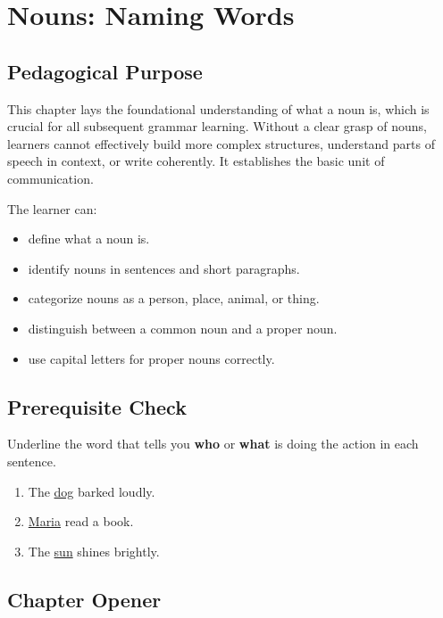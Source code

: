 
\chapter{Nouns: Naming Words}

\section{Pedagogical Purpose}
This chapter lays the foundational understanding of what a noun is, which is crucial for all subsequent grammar learning. Without a clear grasp of nouns, learners cannot effectively build more complex structures, understand parts of speech in context, or write coherently. It establishes the basic unit of communication.

\begin{learningobjectives}
The learner can:
\begin{itemize}
    \item define what a noun is.
    \item identify nouns in sentences and short paragraphs.
    \item categorize nouns as a person, place, animal, or thing.
    \item distinguish between a common noun and a proper noun.
    \item use capital letters for proper nouns correctly.
\end{itemize}
\end{learningobjectives}

\section{Prerequisite Check}
\begin{quickcheck}
Underline the word that tells you \textbf{who} or \textbf{what} is doing the action in each sentence.
\begin{enumerate}
    \item The \underline{dog} barked loudly.
    \item \underline{Maria} read a book.
    \item The \underline{sun} shines brightly.
\end{enumerate}
\end{quickcheck}

\section{Chapter Opener}
